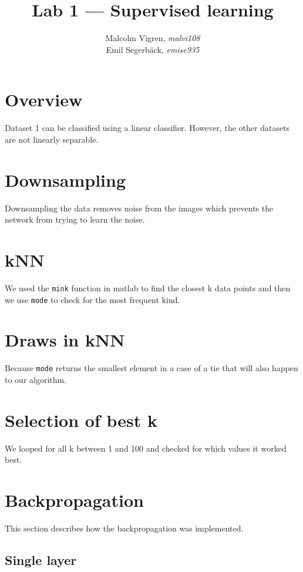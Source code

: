 \documentclass{article}
\begin{document}
\title{Lab 1 --- Supervised learning}
\author{Malcolm Vigren, \textit{malvi108} \\
        Emil Segerbäck, \textit{emise935}}

\maketitle

\section{Overview}
Dataset 1 can be classified using a linear classifier. However, the
other datasets are not linearly separable.

\section{Downsampling}
Downsampling the data removes noise from the images which prevents the
network from trying to learn the noise.

\section{kNN}
We used the \texttt{mink} function in matlab to find the closest k
data points and then we use \texttt{mode} to check for the most
frequent kind.

\section{Draws in kNN}
Because \texttt{mode} returns the smallest element in a case of a tie
that will also happen to our algorithm.

\section{Selection of best k}
We looped for all k between 1 and 100 and checked for which values it
worked best.

\section{Backpropagation}

This section describes how the backpropagation was implemented.

\subsection{Single layer}
\end{document}
